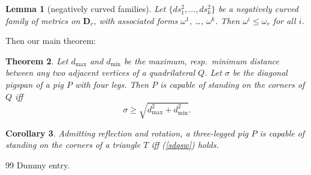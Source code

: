 \documentclass{article}
\theoremstyle{remark}
\theoremstyle{plain}
\theoremstyle{note}
\theoremstyle{citing}
\theoremstyle{break}
\theoremstyle{exercise}
\theoremstyle{plain}
\newtheorem{thmsw}{Theorem}[section]
\newtheorem{corsw}[thmsw]{Corollary}
\newtheorem{lemsw}[thmsw]{Lemma}
\begin{document}
\begin{lemsw}[negatively curved families]
Let $\{ds_1^2,\dots,ds_k^2\}$ be a negatively curved family of metrics
on $\mathbf{D}_r$, with associated forms $\omega^1$, \dots, $\omega^k$.
Then $\omega^i \leq\omega_r$ for all $i$.
\end{lemsw}

Then our main theorem:
\begin{thmsw}
Let $d_{\max}$ and $d_{\min}$ be the maximum, resp.\ minimum distance
between any two adjacent vertices of a quadrilateral $Q$. Let $\sigma$
be the diagonal pigspan of a pig $P$ with four legs.
Then $P$ is capable of standing on the corners of $Q$ iff
\begin{equation}\label{sdqsw}
\sigma\geq \sqrt{d_{\max}^2+d_{\min}^2}.
\end{equation}
\end{thmsw}

\begin{corsw}
Admitting reflection and rotation, a three-legged pig $P$ is capable of
standing on the corners of a triangle $T$ iff (\ref{sdqsw}) holds.
\end{corsw}

\begin{thebibliography}{99}
 Dummy entry.
\end{thebibliography}
\end{document}
